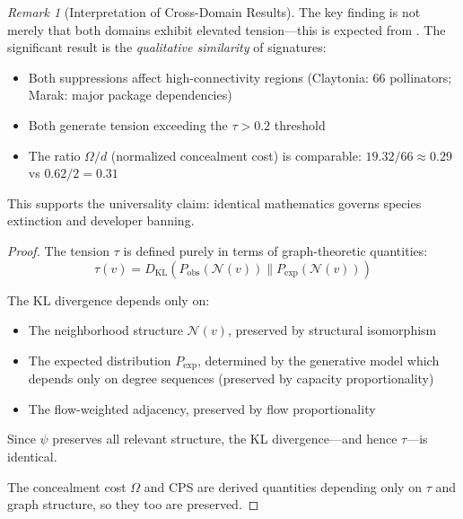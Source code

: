 \documentclass[12pt,a4paper]{article}
\theoremstyle{definition}
\theoremstyle{remark}
\newtheorem{remark}{Remark}[section]
\begin{document}
\begin{remark}[Interpretation of Cross-Domain Results]
The key finding is not merely that both domains exhibit elevated tension—this is expected from . The significant result is the \emph{qualitative similarity} of signatures:
\begin{itemize}
    \item Both suppressions affect high-connectivity regions (Claytonia: 66 pollinators; Marak: major package dependencies)
    \item Both generate tension exceeding the $\tau > 0.2$ threshold
    \item The ratio $\Omega/d$ (normalized concealment cost) is comparable: $19.32/66 \approx 0.29$ vs $0.62/2 = 0.31$
\end{itemize}
This supports the universality claim: identical mathematics governs species extinction and developer banning.
\end{remark}

\begin{proof}
The tension $\tau$ is defined purely in terms of graph-theoretic quantities:
\begin{equation}
    \tau(v) = D_{\text{KL}}(P_{\text{obs}}(\mathcal{N}(v)) \| P_{\text{exp}}(\mathcal{N}(v)))
\end{equation}

The KL divergence depends only on:
\begin{itemize}
    \item The neighborhood structure $\mathcal{N}(v)$, preserved by structural isomorphism
    \item The expected distribution $P_{\text{exp}}$, determined by the generative model which depends only on degree sequences (preserved by capacity proportionality)
    \item The flow-weighted adjacency, preserved by flow proportionality
\end{itemize}

Since $\psi$ preserves all relevant structure, the KL divergence—and hence $\tau$—is identical.

The concealment cost $\Omega$ and CPS are derived quantities depending only on $\tau$ and graph structure, so they too are preserved.
\end{proof}
\end{document}
